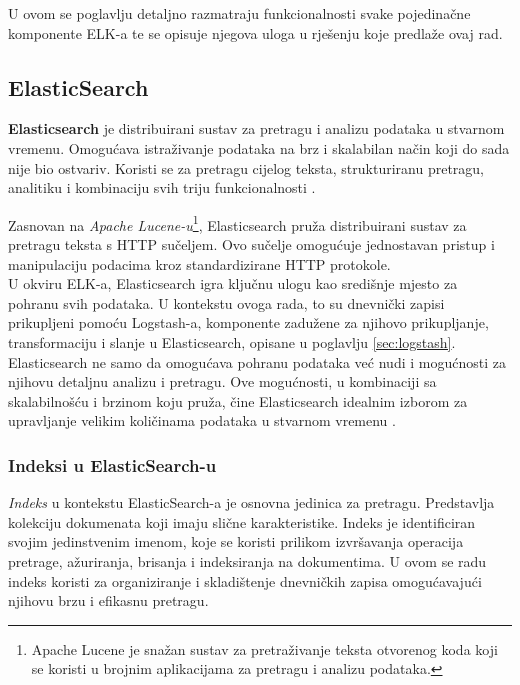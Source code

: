 \documentclass[times, utf8, diplomski]{fer}
\begin{document}
U ovom se poglavlju detaljno razmatraju funkcionalnosti svake pojedinačne komponente ELK-a te se opisuje njegova uloga u rješenju koje predlaže ovaj rad.

\subsection{ElasticSearch}
\label{sec:elastic}

\textbf{Elasticsearch} je distribuirani sustav za pretragu i analizu podataka u stvarnom vremenu. Omogućava istraživanje podataka na brz i skalabilan način koji do sada nije bio ostvariv. Koristi se za pretragu cijelog teksta, strukturiranu pretragu, analitiku i kombinaciju svih triju funkcionalnosti \citep{gormley_elasticsearch_2015}.

Zasnovan na \emph{Apache Lucene-u}\footnote{Apache Lucene je snažan sustav za pretraživanje teksta otvorenog koda koji se koristi u brojnim aplikacijama za pretragu i analizu podataka.}, Elasticsearch pruža distribuirani sustav za pretragu teksta s HTTP sučeljem. Ovo sučelje omogućuje jednostavan pristup i manipulaciju podacima kroz standardizirane HTTP protokole. \\

U okviru ELK-a, Elasticsearch igra ključnu ulogu kao središnje mjesto za pohranu svih podataka. U kontekstu ovoga rada, to su dnevnički zapisi prikupljeni pomoću Logstash-a, komponente zadužene za njihovo prikupljanje, transformaciju i slanje u Elasticsearch, opisane u poglavlju \ref{sec:logstash}.\\

Elasticsearch ne samo da omogućava pohranu podataka već nudi i mogućnosti za njihovu detaljnu analizu i pretragu. Ove mogućnosti, u kombinaciji sa skalabilnošću i brzinom koju pruža, čine Elasticsearch idealnim izborom za upravljanje velikim količinama podataka u stvarnom vremenu .

\subsubsection{Indeksi u ElasticSearch-u}

\emph{Indeks}  u kontekstu ElasticSearch-a je osnovna jedinica za pretragu. Predstavlja kolekciju dokumenata koji imaju slične karakteristike. Indeks je identificiran svojim jedinstvenim imenom, koje se koristi prilikom izvršavanja operacija pretrage, ažuriranja, brisanja i indeksiranja na dokumentima. U ovom se radu indeks koristi za organiziranje i skladištenje dnevničkih zapisa omogućavajući njihovu brzu i efikasnu pretragu.
\end{document}
